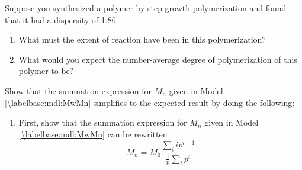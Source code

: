 \begin{activity}
\begin{exercises}
		\exercise Suppose you synthesized a polymer by step-growth polymerization and found that it had a dispersity of 1.86.
		
			\begin{enumerate}
				\item What must the extent of reaction have been in this polymerization?
		
					\begin{solution}
					\end{solution}
					
				\item What would you expect the number-average degree of polymerization of this polymer to be?
		
					\begin{solution}
					\instructordisplay{
						\begin{equation*}
							N_n = \frac{1}{1-p} = \frac{1}{1-0.86} = 7.1
						\end{equation*}
					}
					\end{solution}
			\end{enumerate}
			
		\exercise Show that the summation expression for $M_n$ given in Model \ref{\labelbase:mdl:MwMn} simplifies to the expected result by doing the following: \label{labelbase:exc:Mn}
		
			\begin{enumerate}
				\item First, show that the summation expression for $M_n$ given in Model \ref{\labelbase:mdl:MwMn} can be rewritten
					\begin{equation*}
						M_n = M_0 \frac{{\sum_i i p^{i-1}}}{\frac{1}{p}\sum_i p^i}
					\end{equation*}
					
					\begin{solution}
\end{solution}
\end{enumerate}
\end{exercises}
\end{activity}
